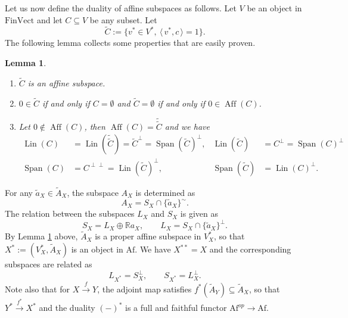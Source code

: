 \documentclass[12pt]{article}
\newtheorem{lemma}{Lemma}
\theoremstyle{definition}
\theoremstyle{remark}
\def\aff{\operatorname{Aff}}
\def\lin{\operatorname{Lin}}
\def\Span{\operatorname{Span}}
\def\<{\langle\,}
\def\>{\,\rangle}
\def \Af{\mathrm{Af}}
\def \FV{\mathrm{FinVect}}
\begin{document}
Let us now define the duality of affine subspaces as follows. Let $V$ be an object in
$\FV$ and let $C\subseteq  V$ be any subset. Let
\[
\tilde C:=\{v^*\in V^*, \ \<v^*,c\>=1\}.
\]
The following lemma collects some properties that are easily proven.

\begin{lemma}\label{lemma:dual}
\begin{enumerate}
\item[(i)] $\tilde C$ is an affine subspace.
\item[(ii)] $0\in \tilde C$ if and only if $C= \emptyset$ and   $\tilde C=\emptyset$ if and only if $0\in \aff(C)$.
\item[(iii)] Let  $0\notin \aff(C)$, then $\aff(C)=\tilde{\tilde C}$ and we have
\begin{align*}
\lin(C)&=\lin(\tilde{\tilde C})=\tilde
C^\perp=\Span(\tilde C)^\perp,&  \lin(\tilde C)&=C^\perp=\Span(C)^\perp \\
\Span(C)&=C^{\perp\perp} =\lin(\tilde C)^\perp,&  \Span(\tilde C)&=\lin(C)^\perp.
\end{align*}

\end{enumerate}


\end{lemma}



For any  $\tilde a_X\in \tilde A_X$, the subspace $A_X$ is determined as
\[
A_X=S_X\cap\{\tilde a_X\}^\sim.
\]
The relation between the subspaces $L_X$ and $S_X$ is given as
\[
S_X=L_X\oplus \mathbb R a_X,\qquad L_X=S_X\cap \{\tilde a_X\}^\perp.
\]
By Lemma \ref{lemma:dual} above,  $\tilde A_X$ is a proper affine subspace in $V_X^*$, so that
$X^*:=(V_X^*,\tilde A_X)$ is an object in $\Af$. We have $X^{**}=X$ and the corresponding subspaces
are related as
\begin{equation}\label{eq:duality}
L_{X^*}=S_X^\perp,\qquad S_{X^*}=L_X^\perp.
\end{equation}
Note also that for $X\xrightarrow{f} Y$, the adjoint map satisfies $f^*(\tilde
A_Y)\subseteq \tilde A_X$, so that $Y^*\xrightarrow{f^*} X^*$ and the duality $(-)^*$ is a
full and faithful functor 
$\Af^{op}\to \Af$.
\end{document}
